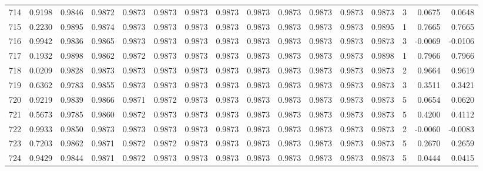 \begin{tabular}{lrrrrrrrrrrrrrrr}
714 &      0.9198 &  0.9846 &  0.9872 &  0.9873 &  0.9873 &  0.9873 &  0.9873 &  0.9873 &  0.9873 &  0.9873 &   0.9873 &     0.9873 &      3 &                    0.0675 &                     0.0648 \\
715 &      0.2230 &  0.9895 &  0.9874 &  0.9873 &  0.9873 &  0.9873 &  0.9873 &  0.9873 &  0.9873 &  0.9873 &   0.9873 &     0.9895 &      1 &                    0.7665 &                     0.7665 \\
716 &      0.9942 &  0.9836 &  0.9865 &  0.9873 &  0.9873 &  0.9873 &  0.9873 &  0.9873 &  0.9873 &  0.9873 &   0.9873 &     0.9873 &      3 &                   -0.0069 &                    -0.0106 \\
717 &      0.1932 &  0.9898 &  0.9862 &  0.9872 &  0.9873 &  0.9873 &  0.9873 &  0.9873 &  0.9873 &  0.9873 &   0.9873 &     0.9898 &      1 &                    0.7966 &                     0.7966 \\
718 &      0.0209 &  0.9828 &  0.9873 &  0.9873 &  0.9873 &  0.9873 &  0.9873 &  0.9873 &  0.9873 &  0.9873 &   0.9873 &     0.9873 &      2 &                    0.9664 &                     0.9619 \\
719 &      0.6362 &  0.9783 &  0.9855 &  0.9873 &  0.9873 &  0.9873 &  0.9873 &  0.9873 &  0.9873 &  0.9873 &   0.9873 &     0.9873 &      3 &                    0.3511 &                     0.3421 \\
720 &      0.9219 &  0.9839 &  0.9866 &  0.9871 &  0.9872 &  0.9873 &  0.9873 &  0.9873 &  0.9873 &  0.9873 &   0.9873 &     0.9873 &      5 &                    0.0654 &                     0.0620 \\
721 &      0.5673 &  0.9785 &  0.9860 &  0.9872 &  0.9873 &  0.9873 &  0.9873 &  0.9873 &  0.9873 &  0.9873 &   0.9873 &     0.9873 &      5 &                    0.4200 &                     0.4112 \\
722 &      0.9933 &  0.9850 &  0.9873 &  0.9873 &  0.9873 &  0.9873 &  0.9873 &  0.9873 &  0.9873 &  0.9873 &   0.9873 &     0.9873 &      2 &                   -0.0060 &                    -0.0083 \\
723 &      0.7203 &  0.9862 &  0.9871 &  0.9872 &  0.9872 &  0.9873 &  0.9873 &  0.9873 &  0.9873 &  0.9873 &   0.9873 &     0.9873 &      5 &                    0.2670 &                     0.2659 \\
724 &      0.9429 &  0.9844 &  0.9871 &  0.9872 &  0.9873 &  0.9873 &  0.9873 &  0.9873 &  0.9873 &  0.9873 &   0.9873 &     0.9873 &      5 &                    0.0444 &                     0.0415 \\

\end{tabular}
